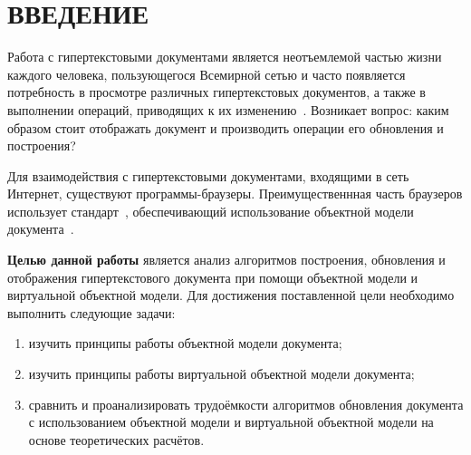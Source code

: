\section*{ВВЕДЕНИЕ}

Работа с гипертекстовыми документами является неотъемлемой частью жизни каждого человека, пользующегося Всемирной сетью и часто появляется потребность в просмотре различных гипертекстовых документов, а также в выполнении операций, приводящих к их изменению~\cite{hypertext-popular}.
Возникает вопрос: каким образом стоит отображать документ и производить операции его обновления и построения?

Для взаимодействия с гипертекстовыми документами, входящими в сеть Интернет, существуют программы-браузеры.
Преимущественнная часть браузеров использует стандарт~\cite{dom-doc}, обеспечивающий использование объектной модели документа~\cite{dom}. 


\textbf{Целью данной работы} является анализ алгоритмов построения, обновления и отображения гипертекстового документа при помощи объектной модели и виртуальной объектной модели.
Для достижения поставленной цели необходимо выполнить следующие задачи:

\begin{enumerate}[label=\arabic*)]
	\item изучить принципы работы объектной модели документа;
	\item изучить принципы работы виртуальной объектной модели документа;
	\item сравнить и проанализировать трудоёмкости алгоритмов обновления документа с использованием объектной модели и виртуальной объектной модели на основе теоретических расчётов.
\end{enumerate}


\pagebreak